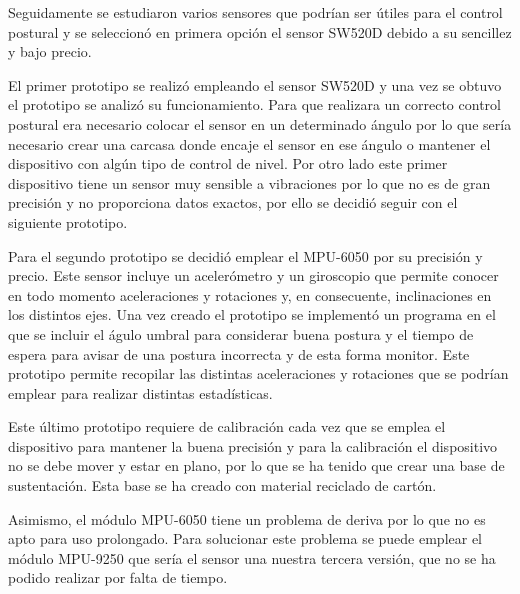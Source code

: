 Seguidamente se estudiaron varios sensores que podrían ser útiles para el control postural y se seleccionó en primera opción el sensor SW520D debido a su sencillez y bajo precio.

El primer prototipo se realizó empleando el sensor SW520D y una vez se obtuvo el prototipo se analizó su funcionamiento. Para que realizara un correcto control postural era necesario colocar el sensor en un determinado ángulo por lo que sería necesario crear una carcasa donde encaje el sensor en ese ángulo o mantener el dispositivo con algún tipo de control de nivel. Por otro lado este primer dispositivo tiene un sensor muy sensible a vibraciones por lo que no es de gran precisión y no proporciona datos exactos, por ello se decidió seguir con el siguiente prototipo.

Para el segundo prototipo se decidió emplear el MPU-6050 por su precisión y precio. Este sensor incluye un acelerómetro y un giroscopio que permite conocer en todo momento aceleraciones y rotaciones y, en consecuente, inclinaciones en los distintos ejes. Una vez creado el prototipo se implementó un programa en el que se incluir el águlo umbral para considerar buena postura y el tiempo de espera para avisar de una postura incorrecta y de esta forma monitor. Este prototipo permite recopilar las distintas aceleraciones y rotaciones que se podrían emplear para realizar distintas estadísticas.

Este último prototipo requiere de calibración cada vez que se emplea el dispositivo para mantener la buena precisión y para la calibración el dispositivo no se debe mover y estar en plano, por lo que se ha tenido que crear una base de sustentación. Esta base se ha creado con material reciclado de cartón.

Asimismo, el módulo MPU-6050 tiene un problema de deriva por lo que no es apto para uso prolongado. Para solucionar este problema se puede emplear el módulo MPU-9250 que sería el sensor una nuestra tercera versión, que no se ha podido realizar por falta de tiempo.




